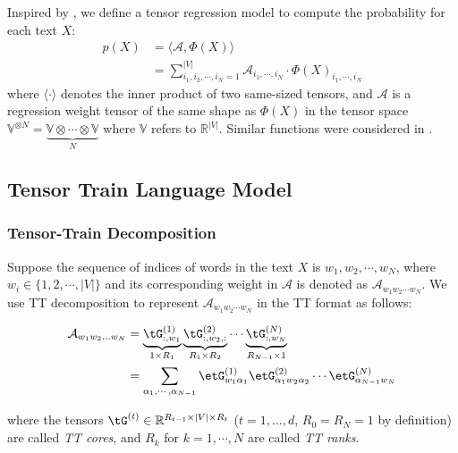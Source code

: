 \documentclass{article}
\theoremstyle{plain}
\theoremstyle{definition}
\theoremstyle{remark}
\begin{document}
Inspired by \cite{zhang2019generalized, kossaifi2020tensor}, we define a tensor regression model to compute the probability for each text $X$:
%
\begin{align} 
    \label{eq: general definition}
    p(X)
    &= \langle\mathcal{A}, \Phi(X)\rangle \nonumber \\
    &= \sum_{i_1,i_2,\cdots,i_N = 1}^{|V|} \mathcal{A}_{i_1,\cdots, i_N} \cdot \Phi(X)_{i_1,\cdots, i_N}
\end{align}
%
where $\langle \cdot \rangle$ denotes the inner product of two same-sized tensors, and  $\mathcal{A}$ is a regression weight tensor of the same shape as $\Phi(X)$ in the tensor space $\mathbb{V}^{\otimes N} = \underbrace{\mathbb{V} \otimes \cdots \otimes \mathbb{V}}_N $ where $\mathbb{V}$ refers to $\mathbb{R}^{|V|}$. Similar functions were considered in \cite{novikov2016exponential, NIPS2016_6211, khrulkov2018expressive, zhang2019generalized}.


\subsection{Tensor Train Language Model}
\label{sec: TTLM}
\subsubsection{Tensor-Train Decomposition}
Suppose the sequence of indices of words in the text $X$ is  $w_1, w_2, \cdots, w_N$, where  $w_i \in \{1, 2, \cdots, |V|\}$ and its corresponding weight in $\mathcal{A}$ is denoted as $\mathcal{A}_{w_1 w_2\cdots w_N}$. We use TT decomposition to  represent $\mathcal{A}_{w_1 w_2\cdots w_N}$ in the TT format \citep{oseledets2011tensor} as follows: 


\begin{align} 
    \label{eq: TT_index}
    \mathcal{A}_{w_1w_2...w_N} 
    & = \underbrace{\tG^{(1)}_{:, w_1}}_{1\times R_1} \underbrace{\tG^{(2)}_{:, w_2, :}}_{R_1 \times R_2} \cdots \underbrace{\tG^{(N)}_{:, w_N}}_{R_{N-1} \times 1}  \\
    &= \sum_{\alpha_1, \cdots, \alpha_{N-1}}   \etG^{(1)}_{w_1\alpha_1} \etG^{(2)}_{\alpha_1w_2\alpha_2} \cdots \etG^{(N)}_{\alpha_{N-1}w_N}  \nonumber
\end{align}

where the tensors  $\tG^{(t)} \in \mathbb{R}^{R_{t-1} \times |V| \times R_t}$ ($t =1,...,d$, $R_0 = R_N = 1$ by definition) are called \textit{TT cores}, and  $R_k$ for $k = 1,\cdots,N$ are called \textit{TT ranks}. 
\end{document}
